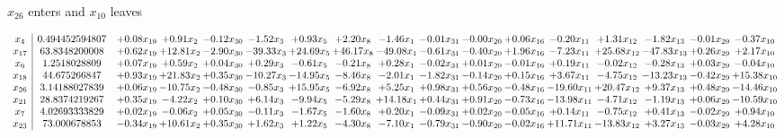 \documentclass[9pt]{article}
\begin{document}
 $ x_{26} $ enters and $ x_{10} $ leaves 

 \[\begin{array}{c| c c@{\hskip 2pt} c@{\hskip 2pt} c@{\hskip 2pt} c@{\hskip 2pt} c@{\hskip 2pt} c@{\hskip 2pt} c@{\hskip 2pt} c@{\hskip 2pt} c@{\hskip 2pt} c@{\hskip 2pt} c@{\hskip 2pt} c@{\hskip 2pt} c@{\hskip 2pt} c@{\hskip 2pt} c@{\hskip 2pt} }
 x_{4}   &  0.494452594807 & +  0.08 x_{19} & +  0.91 x_{2} & -0.12 x_{30} & -1.52 x_{3} & +  0.93 x_{5} & +  2.20 x_{8} & -1.46 x_{1} & -0.01 x_{31} & -0.00 x_{20} & +  0.06 x_{16} & -0.20 x_{11} & +  1.31 x_{12} & -1.82 x_{13} & -0.01 x_{29} & -0.37 x_{10}\\
 x_{17}   &  63.8348200008 & +  0.62 x_{19} & + 12.81 x_{2} & -2.90 x_{30} & -39.33 x_{3} & + 24.69 x_{5} & + 46.17 x_{8} & -49.08 x_{1} & -0.61 x_{31} & -0.40 x_{20} & +  1.96 x_{16} & -7.23 x_{11} & + 25.68 x_{12} & -47.83 x_{13} & +  0.26 x_{29} & +  2.17 x_{10}\\
 x_{6}   &  1.2518028809 & +  0.07 x_{19} & +  0.59 x_{2} & +  0.04 x_{30} & +  0.29 x_{3} & -0.61 x_{5} & -0.21 x_{8} & +  0.28 x_{1} & -0.02 x_{31} & +  0.01 x_{20} & -0.01 x_{16} & +  0.19 x_{11} & -0.02 x_{12} & -0.28 x_{13} & +  0.03 x_{29} & -0.04 x_{10}\\
 x_{18}   &  44.675266847 & +  0.93 x_{19} & + 21.83 x_{2} & +  0.35 x_{30} & -10.27 x_{3} & -14.95 x_{5} & -8.46 x_{8} & -2.01 x_{1} & -1.82 x_{31} & -0.14 x_{20} & +  0.15 x_{16} & +  3.67 x_{11} & -4.75 x_{12} & -13.23 x_{13} & -0.42 x_{29} & + 15.38 x_{10}\\
 x_{26}   &  3.14188027839 & +  0.06 x_{19} & -10.75 x_{2} & -0.48 x_{30} & -0.85 x_{3} & + 15.95 x_{5} & -6.92 x_{8} & +  5.25 x_{1} & +  0.98 x_{31} & +  0.56 x_{20} & -0.48 x_{16} & -19.60 x_{11} & + 20.47 x_{12} & +  9.37 x_{13} & +  0.48 x_{29} & -14.46 x_{10}\\
 x_{21}   &  28.8374219267 & +  0.35 x_{19} & -4.22 x_{2} & +  0.10 x_{30} & +  6.14 x_{3} & -9.94 x_{5} & -5.29 x_{8} & + 14.18 x_{1} & +  0.44 x_{31} & +  0.91 x_{20} & -0.73 x_{16} & -13.98 x_{11} & -4.71 x_{12} & -1.19 x_{13} & +  0.06 x_{29} & -10.59 x_{10}\\
 x_{7}   &  4.02693333829 & +  0.02 x_{19} & -0.06 x_{2} & +  0.05 x_{30} & -0.11 x_{3} & -1.67 x_{5} & -1.60 x_{8} & +  0.20 x_{1} & -0.09 x_{31} & +  0.02 x_{20} & -0.05 x_{16} & +  0.14 x_{11} & -0.75 x_{12} & +  0.41 x_{13} & -0.02 x_{29} & +  0.94 x_{10}\\
 x_{23}   &  73.000678853 & -0.34 x_{19} & + 10.61 x_{2} & +  0.35 x_{30} & +  1.62 x_{3} & +  1.22 x_{5} & -4.30 x_{8} & -7.10 x_{1} & -0.79 x_{31} & -0.90 x_{20} & -0.02 x_{16} & + 11.71 x_{11} & -13.83 x_{12} & +  3.27 x_{13} & -0.03 x_{29} & +  4.28 x_{10}\\

\end{array}\]
\end{document}
